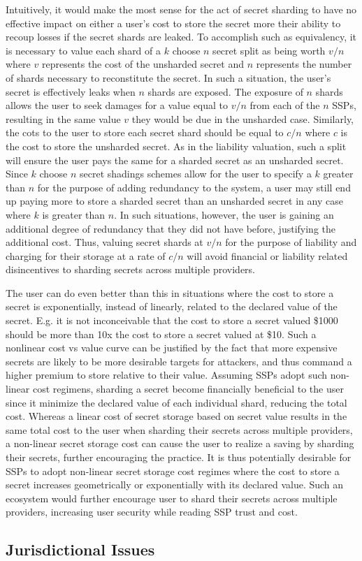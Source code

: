 Intuitively, it would make the most sense for the act of secret
sharding to have no effective impact on either a user's cost to store
the secret more their ability to recoup losses if the secret shards
are leaked. To accomplish such as equivalency, it is necessary to
value each shard of a $k$ choose $n$ secret split as being worth $v/n$
where $v$ represents the cost of the unsharded secret and $n$
represents the number of shards necessary to reconstitute the
secret. In such a situation, the user's secret is effectively leaks
when $n$ shards are exposed. The exposure of $n$ shards allows the
user to seek damages for a value equal to $v/n$ from each of the $n$
SSPs, resulting in the same value $v$ they would be due in the
unsharded case. Similarly, the cots to the user to store each secret
shard should be equal to $c/n$ where $c$ is the cost to store the
unsharded secret. As in the liability valuation, such a split will
ensure the user pays the same for a sharded secret as an unsharded
secret. Since $k$ choose $n$ secret shadings schemes allow for the
user to specify a $k$ greater than $n$ for the purpose of adding
redundancy to the system, a user may still end up paying more to store
a sharded secret than an unsharded secret in any case where $k$ is
greater than $n$. In such situations, however, the user is gaining an
additional degree of redundancy that they did not have before,
justifying the additional cost. Thus, valuing secret shards at $v/n$
for the purpose of liability and charging for their storage at a rate
of $c/n$ will avoid financial or liability related disincentives to
sharding secrets across multiple providers.

The user can do even better than this in situations where the cost to
store a secret is exponentially, instead of linearly, related to the
declared value of the secret. E.g. it is not inconceivable that the
cost to store a secret valued \$1000 should be more than 10x the cost
to store a secret valued at \$10. Such a nonlinear cost vs value curve
can be justified by the fact that more expensive secrets are likely to
be more desirable targets for attackers, and thus command a higher
premium to store relative to their value. Assuming SSPs adopt such
non-linear cost regimens, sharding a secret become financially
beneficial to the user since it minimize the declared value of each
individual shard, reducing the total cost. Whereas a linear cost of
secret storage based on secret value results in the same total cost to
the user when sharding their secrets across multiple providers, a
non-linear secret storage cost can cause the user to realize a saving
by sharding their secrets, further encouraging the practice. It is
thus potentially desirable for SSPs to adopt non-linear secret storage
cost regimes where the cost to store a secret increases geometrically
or exponentially with its declared value. Such an ecosystem would
further encourage user to shard their secrets across multiple
providers, increasing user security while reading SSP trust and cost.

\subsection{Jurisdictional Issues}
\label{chap:policy:trust:jurisdiction}

